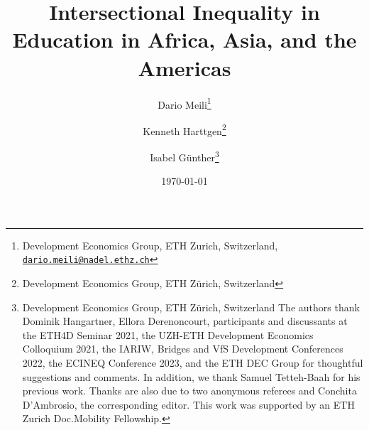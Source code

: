 

\title{Intersectional Inequality in Education in Africa, Asia, and the Americas}
\author{
   Dario Meili\thanks{Development Economics Group, ETH Zurich, Switzerland, \href{mailto:dario.meili@nadel.ethz.ch}{\nolinkurl{dario.meili@nadel.ethz.ch}} 
  } \and
  Kenneth Harttgen\thanks{
    Development Economics Group, ETH Zürich, Switzerland
  } \and
  Isabel Günther\thanks{
    Development Economics Group, ETH Zürich, Switzerland
    \newline
   The authors thank Dominik Hangartner, Ellora Derenoncourt, participants and discussants at the ETH4D Seminar 2021, the UZH-ETH Development Economics Colloquium 2021, the IARIW, Bridges and VfS Development Conferences 2022, the ECINEQ Conference 2023, and the ETH DEC Group for thoughtful suggestions and comments. In addition, we thank Samuel Tetteh-Baah for his previous work. Thanks are also due to two anonymous referees and Conchita D'Ambrosio, the corresponding editor. This work was supported by an ETH Zurich Doc.Mobility Fellowship. 
  }
}
\date{\today}


\maketitle
\thispagestyle{empty} %

